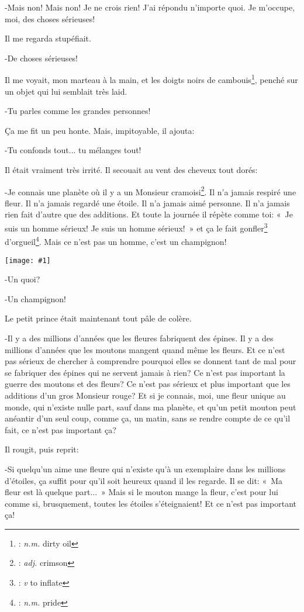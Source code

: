 \documentclass{report}
\newcommand{\pos}[1]{\textit{#1}}
\newcommand{\ft}[3][]{\footnote{%
\if\relax\detokenize{#1}\relax\else#1: \fi%
\if\relax\detokenize{#2}\relax\else\pos{#2} \fi%
#3}}
\newcommand{\incpic}[1]{%
\begin{center}
    \texttt{[image: \#1]}
\end{center}%
}
\begin{document}
-Mais non! Mais non! Je ne crois rien! J'ai répondu n'importe quoi. Je m'occupe, moi, des choses sérieuses!

Il me regarda stupéfiait.

-De choses sérieuses!

Il me voyait, mon marteau à la main, et les doigts noirs de cambouis\ft[]{n.m.}{dirty oil}, penché sur un objet qui lui semblait très laid.

-Tu parles comme les grandes personnes!

Ça me fit un peu honte. Mais, impitoyable, il ajouta:

-Tu confonds tout... tu mélanges tout!

Il était vraiment très irrité. Il secouait au vent des cheveux tout dorés:

-Je connais une planète où il y a un Monsieur cramoisi\ft[]{adj.}{crimson}. Il n'a jamais respiré une fleur. Il n'a jamais regardé une étoile. Il n'a jamais aimé personne. Il n'a jamais rien fait d'autre que des additions. Et toute la journée il répète comme toi: «~Je suis un homme sérieux! Je suis un homme sérieux!~» et ça le fait gonfler\ft[]{v}{to inflate} d'orgueil\ft[]{n.m.}{pride}. Mais ce n'est pas un homme, c'est un champignon! 

\incpic{pic/image17.jpeg}

-Un quoi?

-Un champignon!

Le petit prince était maintenant tout pâle de colère.

-Il y a des millions d'années que les fleures fabriquent des épines. Il y a des millions d'années que les moutons mangent quand même les fleurs. Et ce n'est pas sérieux de chercher à comprendre pourquoi elles se donnent tant de mal pour se fabriquer des épines qui ne servent jamais à rien? Ce n'est pas important la guerre des moutons et des fleurs? Ce n'est pas sérieux et plus important que les additions d'un gros Monsieur rouge? Et si je connais, moi, une fleur unique au monde, qui n'existe nulle part, sauf dans ma planète, et qu'un petit mouton peut anéantir d'un seul coup, comme ça, un matin, sans se rendre compte de ce qu'il fait, ce n'est pas important ça?

Il rougit, puis reprit:

-Si quelqu'un aime une fleure qui n'existe qu'à un exemplaire dans les millions d'étoiles, ça suffit pour qu'il soit heureux quand il les regarde. Il se dit: «~Ma fleur est là quelque part...~» Mais si le mouton mange la fleur, c'est pour lui comme si, brusquement, toutes les étoiles s'éteignaient! Et ce n'est pas important ça!
\end{document}
